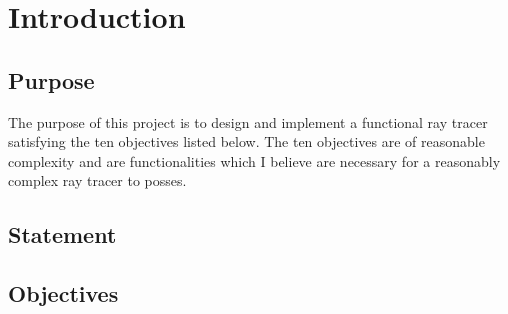 \chapter{Introduction}

\section{Purpose}
The purpose of this project is to design and implement a functional ray tracer
satisfying the ten objectives listed below. The ten objectives are of reasonable
complexity and are functionalities which I believe are necessary for a 
reasonably complex ray tracer to posses.

\section{Statement}


\section{Objectives}
